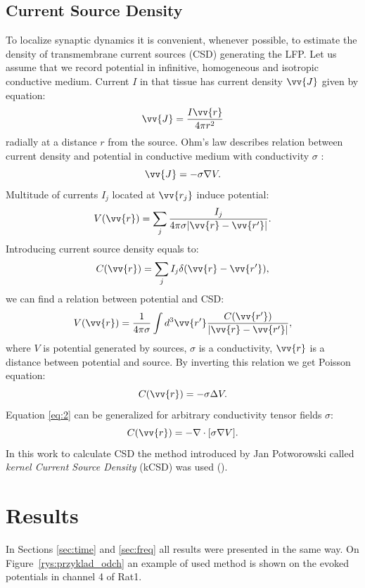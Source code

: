 \documentclass{pracalicmgr}
\begin{document}
   \section{Current Source Density}
   To localize synaptic dynamics it is convenient, whenever possible, to estimate the density of transmembrane current sources (CSD) generating the LFP. Let us assume that we record potential in infinitive, homogeneous and isotropic conductive medium. Current $I$ in that tissue has current density $\vv{J}$ given by equation:
   \begin{equation}
   \vv{J}= \frac{I \vv{r}}{4\pi r^2}
   \end{equation}
   radially at a distance $r$ from the source. Ohm's law describes relation between current density and potential in conductive medium with conductivity $\sigma$ :
   \begin{equation}
   \vv{J}=-\sigma \nabla V.
   \end{equation}
   Multitude of currents $I_j$ located at $\vv{r_j}$ induce potential:
   \begin{equation}
   V(\vv{r})=\sum_{j} \frac{I_j}{4 \pi \sigma |\vv{r}-\vv{r'}|} .
   \end{equation}
   Introducing current source density equals to:
   \begin{equation}
   C(\vv{r})=\sum_{j} I_j \delta (\vv{r}-\vv{r'}),
   \end{equation}
   we can find a relation between potential and CSD:
   \begin{equation}
   V(\vv{r})=\frac{1}{4\pi\sigma}\int d^3 \vv{r'} \frac{C(\vv{r'})}{|\vv{r}-\vv{r'}|},
   \end{equation}
   where $V$ is potential generated by sources, $\sigma$ is a conductivity, $\vv{r}$ is a distance between potential and source. By inverting this relation we get Poisson equation:
   \begin{equation}
   C(\vv{r})=-\sigma \Delta V.
   \label{eq:2}
   \end{equation}
   Equation \ref{eq:2} can be generalized for arbitrary conductivity tensor fields $\sigma$:
   \begin{equation}
   C(\vv{r})=-\nabla \cdot [\sigma \nabla V].
   \end{equation}
   In this work to calculate CSD the method introduced by Jan Potworowski called \textit{kernel Current Source Density} (kCSD) was used (\cite{potworowski, wojcik}).
    
    \chapter{Results}
	In Sections \ref{sec:time} and \ref{sec:freq} all results were presented in the same way. On Figure~\ref{rys:przyklad_odch} an example of used method is shown on the evoked potentials in channel 4 of Rat1.
	
\end{document}
